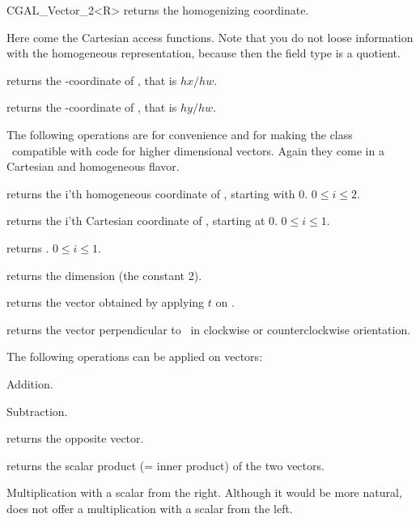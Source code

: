 \begin {classtemplate} {CGAL_Vector_2<R>}
       {returns the homogenizing  coordinate.}

Here come the Cartesian access functions.  Note that you do not loose
information with the homogeneous representation, because then the field
type is a quotient.


       {returns the -coordinate of \var, that is $hx/hw$.}

       {returns the -coordinate of \var, that is $hy/hw$.}

The following operations are for convenience and for making the
class \classname\ compatible with code for higher dimensional vectors.
Again they come in a Cartesian and homogeneous flavor.

       {returns the i'th homogeneous coordinate of \var, starting with 0.
        \precond $0\leq i \leq 2$.}

       {returns the i'th Cartesian coordinate of \var, starting at 0.
        \precond $0\leq i \leq 1$.}

       {returns  .
        \precond $0\leq i \leq 1$.}

       {returns the dimension (the constant 2).}

       {returns the vector obtained by applying $t$ on \var.}

       {returns the vector perpendicular to \var\ in clockwise or
        counterclockwise orientation.}

The following operations can be applied on vectors:

       {Addition.}

       {Subtraction.}

       {returns the opposite vector.}

       {returns the scalar product (= inner product) of the two vectors.}


       {Multiplication with a scalar from the right. Although it would
        be more natural, \cgal does not offer a multiplication with a 
        scalar from the left.}



\end{classtemplate}
